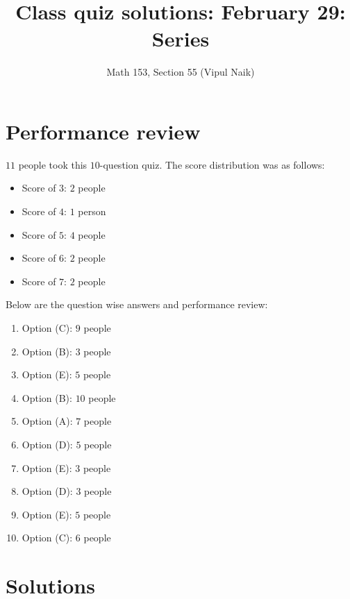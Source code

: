 \documentclass[10pt]{amsart}
\title{Class quiz solutions: February 29: Series}
\author{Math 153, Section 55 (Vipul Naik)}
\begin{document}
\maketitle

\section{Performance review}

$11$ people took this $10$-question quiz. The score distribution was
as follows:

\begin{itemize}
\item Score of $3$: $2$ people
\item Score of $4$: $1$ person
\item Score of $5$: $4$ people
\item Score of $6$: $2$ people
\item Score of $7$: $2$ people
\end{itemize}


Below are the question wise answers and performance review:

\begin{enumerate}
\item Option (C): $9$ people
\item Option (B): $3$ people
\item Option (E): $5$ people
\item Option (B): $10$ people
\item Option (A): $7$ people
\item Option (D): $5$ people
\item Option (E): $3$ people
\item Option (D): $3$ people
\item Option (E): $5$ people
\item Option (C): $6$ people
\end{enumerate}

\section{Solutions}
\end{document}
